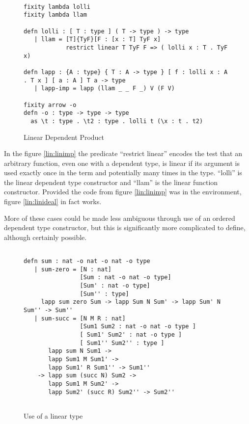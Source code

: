 \begin{figure}[H]
\begin{lstlisting}

fixity lambda lolli
fixity lambda llam

defn lolli : [ T : type ] ( T -> type ) -> type
   | llam = [T]{TyF}[F : [x : T] TyF x]
            restrict linear T TyF F => ( lolli x : T . TyF x)

defn lapp : {A : type} { T : A -> type } [ f : lolli x : A . T x ] [ a : A ] T a -> type
   | lapp-imp = lapp (llam _ _ F _) V (F V)

fixity arrow -o
defn -o : type -> type -> type
  as \t : type . \t2 : type . lolli t (\x : t . t2)

\end{lstlisting}
\caption{Linear Dependent Product}
\label{lin:lindep}
\end{figure}


In the figure \ref{lin:linimp} the predicate ``restrict linear'' encodes the test that an arbitrary function, even one with a dependent type, is linear \citep{benton1993term} if its argument is used
exactly once in the term and potentially many times in the type.  
``lolli'' is the linear dependent type constructor and ``llam'' is the linear function constructor.
Provided the code from figure \ref{lin:linimp} was in the environment, figure \ref{lin:linideal} in fact works.


More of these cases could be made less ambiguous through use of an ordered dependent type 
constructor, but this is significantly more complicated to define, although certainly possible.


\begin{figure}[H]
\begin{lstlisting}

defn sum : nat -o nat -o nat -o type
   | sum-zero = [N : nat]
                [Sum : nat -o nat -o type]
                [Sum' : nat -o type]
                [Sum'' : type]
     lapp sum zero Sum -> lapp Sum N Sum' -> lapp Sum' N Sum'' -> Sum''
   | sum-succ = [N M R : nat]
                [Sum1 Sum2 : nat -o nat -o type ]
                [ Sum1' Sum2' : nat -o type ]
                [ Sum1'' Sum2'' : type ]
       lapp sum N Sum1 ->
       lapp Sum1 M Sum1' -> 
       lapp Sum1' R Sum1'' -> Sum1''
    -> lapp sum (succ N) Sum2 -> 
       lapp Sum1 M Sum2' ->
       lapp Sum2' (succ R) Sum2'' -> Sum2''
   
\end{lstlisting}
\caption{Use of a linear type}
\label{lin:use}
\end{figure}


